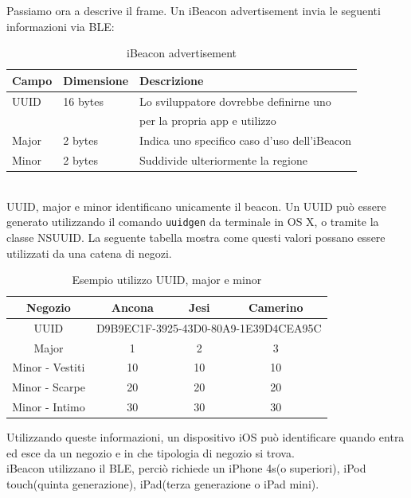 Passiamo ora a descrive il frame.
Un iBeacon advertisement invia le seguenti informazioni via BLE:
\begin{table}[htbp]
\begin{center}
\begin{tabular}{|l|l|l|}
\hline
Campo & Dimensione & Descrizione \\
\hline
UUID & 16 bytes & Lo sviluppatore dovrebbe definirne uno\\
& & per la propria app e utilizzo \\
\hline
Major & 2 bytes & Indica uno specifico caso d'uso dell'iBeacon\\
\hline
Minor & 2 bytes & Suddivide ulteriormente la regione\\
\hline
\end{tabular}
\end{center}
\caption{iBeacon advertisement}
\label{tab:ibeacon}
\end{table}
\\UUID, major e minor identificano unicamente il beacon. 
Un UUID può essere generato utilizzando il comando \texttt{uuidgen} da terminale in OS X, o tramite  la classe NSUUID.
La seguente tabella mostra come questi valori possano essere utilizzati da una catena di negozi. 
\begin{table}[htbp]
\begin{center}
\begin{tabular}{|c|c|c|c|}
\hline
Negozio & Ancona & Jesi & Camerino \\
\hline
UUID &
\multicolumn{3}{c|}{D9B9EC1F-3925-43D0-80A9-1E39D4CEA95C} \\
\hline
Major & 1 & 2 & 3\\
\hline
Minor - Vestiti  & 10 & 10 & 10\\
\hline
Minor - Scarpe & 20 & 20 & 20\\
\hline
Minor - Intimo & 30 & 30 & 30\\
\hline
\end{tabular}
\end{center}
\caption{Esempio utilizzo UUID, major e minor}
\label{tab:example}
\end{table}
Utilizzando queste informazioni, un dispositivo iOS può identificare quando entra ed esce da un negozio e in che tipologia di negozio si trova. 
\\
iBeacon utilizzano il BLE, perciò richiede un iPhone 4s(o superiori), iPod touch(quinta generazione), iPad(terza generazione o iPad mini).
